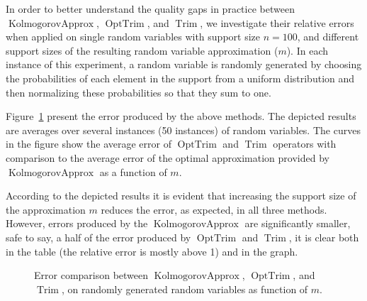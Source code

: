 \documentclass{article}
\DeclareMathOperator{\Trim}{Trim}
\DeclareMathOperator{\KlmApprox}{KolmogorovApprox}
\DeclareMathOperator{\OptTrim}{OptTrim}
\begin{document}
In order to better understand the quality gaps in practice between $\KlmApprox$, $\OptTrim$, and $\Trim$, we investigate their relative errors when applied on single random variables with support size $n = 100$, and different support sizes of the resulting random variable approximation ($m$). In each instance of this experiment, a random variable is randomly generated by choosing the probabilities of each element in the support from a uniform distribution and then normalizing these probabilities so that they sum to one.

Figure~\ref{fig:error} present the error produced by the above methods. The depicted results are averages over several instances (50 instances) of random variables. The curves in the figure show the average error of $\OptTrim$ and $\Trim$ operators with comparison to the average error of the optimal approximation provided by $\KlmApprox$ as a function of $m$.  

According to the depicted results it is evident that increasing the support size of the approximation $m$ reduces the error, as expected, in all three methods. However, errors produced by the $\KlmApprox$ are significantly smaller, safe to say, a half of the error produced by $\OptTrim$ and $\Trim$, it is clear both in the table (the relative error is mostly above 1) and in the graph.


\begin{figure}[htb]
	\scriptsize	
	\centering 
	\caption{Error comparison between $\KlmApprox$, $\OptTrim$, and $\Trim$, on randomly generated random variables as function of $m$.}
	\label{fig:error}
\end{figure}
\end{document}
